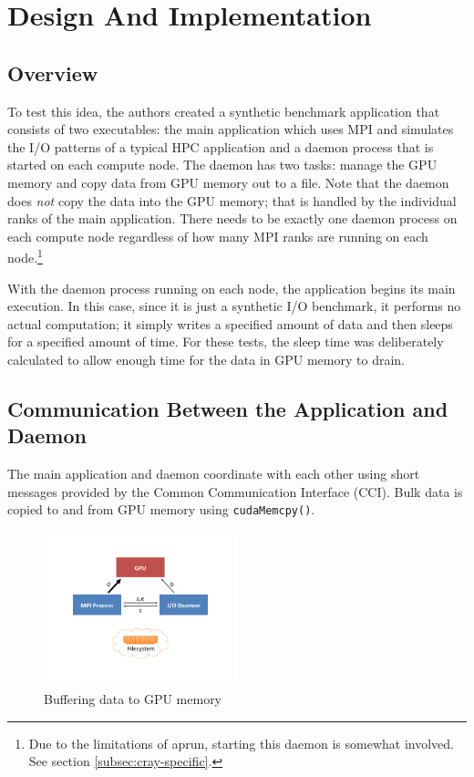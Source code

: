 \section{Design And Implementation}
\label{sec:design}

\subsection{Overview}
\label{subsec:overview}
To test this idea, the authors created a synthetic benchmark application that consists of two executables: the main application which uses MPI and simulates the I/O patterns of a typical HPC application and a daemon process that is started on each compute node.  The daemon has two tasks: manage the GPU memory and copy data from GPU memory out to a file.  Note that the daemon does \emph{not} copy the data into the GPU memory; that is handled by the individual ranks of the main application. There needs to be exactly one daemon process on each compute node regardless of how many MPI ranks are running on each node.\footnote{Due to the limitations of aprun, starting this daemon is somewhat involved.  See section \ref{subsec:cray-specific}.}

With the daemon process running on each node, the application begins its main execution.  In this case, since it is just a synthetic 
I/O benchmark, it performs no actual computation; it simply writes a specified amount of data and then sleeps for a specified amount of time.  For these tests, the sleep time was deliberately calculated to allow enough time for the data in GPU memory to drain.
\subsection{Communication Between the Application and Daemon}
\label{subsec:comm}

The main application and daemon coordinate with each other using short messages provided by the Common Communication Interface (CCI).\cite{atchley11:cci} Bulk data is copied to and from GPU memory using \texttt{cudaMemcpy()}.

\begin{figure}
\includegraphics[trim = .75in .75in .75in .75in, clip, width=0.5\textwidth]{figures/Data_Movement/Slide20}%
\caption{Buffering data to GPU memory}
\label{fig:buffer_write}
\end{figure}

